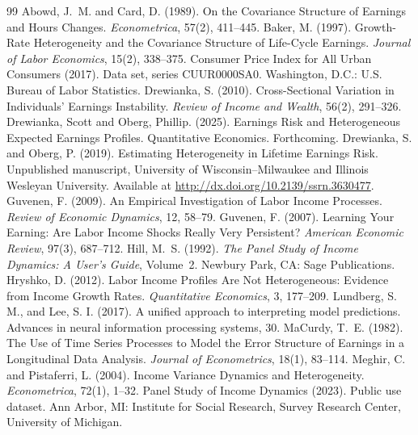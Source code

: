 \documentclass[12pt]{article}
\begin{document}
\begin{thebibliography}{99}
 Abowd, J.~M. and Card, D. (1989). On the Covariance Structure of Earnings and Hours Changes. \textit{Econometrica}, 57(2), 411--445.
 Baker, M. (1997). Growth-Rate Heterogeneity and the Covariance Structure of Life-Cycle Earnings. \textit{Journal of Labor Economics}, 15(2), 338--375.
 Consumer Price Index for All Urban Consumers (2017). Data set, series CUUR0000SA0. Washington, D.C.: U.S. Bureau of Labor Statistics.
 Drewianka, S. (2010). Cross-Sectional Variation in Individuals’ Earnings Instability. \textit{Review of Income and Wealth}, 56(2), 291--326.
Drewianka, Scott and Oberg, Phillip. (2025). Earnings Risk and Heterogeneous Expected Earnings Profiles. Quantitative Economics. Forthcoming.
 Drewianka, S. and Oberg, P. (2019). Estimating Heterogeneity in Lifetime Earnings Risk. Unpublished manuscript, University of Wisconsin--Milwaukee and Illinois Wesleyan University. Available at \url{http://dx.doi.org/10.2139/ssrn.3630477}.
 Guvenen, F. (2009). An Empirical Investigation of Labor Income Processes. \textit{Review of Economic Dynamics}, 12, 58--79.
 Guvenen, F. (2007). Learning Your Earning: Are Labor Income Shocks Really Very Persistent? \textit{American Economic Review}, 97(3), 687--712.
 Hill, M.~S. (1992). \textit{The Panel Study of Income Dynamics: A User’s Guide}, Volume~2. Newbury Park, CA: Sage Publications.
 Hryshko, D. (2012). Labor Income Profiles Are Not Heterogeneous: Evidence from Income Growth Rates. \textit{Quantitative Economics}, 3, 177--209.
 Lundberg, S. M., and Lee, S. I. (2017). A unified approach to interpreting model predictions. Advances in neural information processing systems, 30.
 MaCurdy, T.~E. (1982). The Use of Time Series Processes to Model the Error Structure of Earnings in a Longitudinal Data Analysis. \textit{Journal of Econometrics}, 18(1), 83--114.
 Meghir, C. and Pistaferri, L. (2004). Income Variance Dynamics and Heterogeneity. \textit{Econometrica}, 72(1), 1--32.
 Panel Study of Income Dynamics (2023). Public use dataset. Ann Arbor, MI: Institute for Social Research, Survey Research Center, University of Michigan.


\end{thebibliography}
\end{document}
